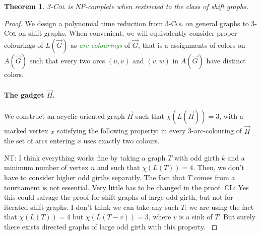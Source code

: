 \documentclass[11pt,a4aper]{article}
\newtheorem{theorem}{Theorem}
\renewcommand{\geq}{\geqslant}
\DeclareRobustCommand*{\ora}{\overrightarrow}
\newcommand*{\orG}{\ora{G}}
\newcommand*{\orH}{\ora{H}}
\newcommand*{\Col}
{\textsc{3-Col} }
\newcommand{\defin}[1]{\emph{\textcolor{ForestGreen}{#1}}}
\newcommand{\clement}[1]{{\color{orange} CL: #1}}
\newcommand{\nicolas}[1]{{\color{purple} NT: #1}}
\begin{document}
\begin{theorem}\label{thm:3col}
  \Col is NP-complete when restricted to the class of shift graphs.


\end{theorem}
\begin{proof}
  We design a polynomial time reduction from \Col on general graphs to \Col on
  shift graphs.
  When convenient, we will equivalently consider proper colourings of $L(\orG)$ as \defin{arc-colourings} of
  $\orG$, that is a assignments of colors on $A(\orG)$ such that every two arcs $(u,v)$ and
  $(v,w)$ in $A(\orG)$ have distinct colors.

  \paragraph{The gadget $\orH$.}
  We construct an acyclic oriented graph $\orH$ such that $\chi(L(\orH))=3$,
  with a marked vertex $x$ satisfying the following property: in every 3-arc-colouring of $\orH$
  the set of arcs entering $x$ uses exactly two colours. 
 

\nicolas{I think everything works fine by taking a graph $T$ with
  odd girth $k$ and a minimum number of vertex $n$ and such that
  $\chi(L(T)) = 4$. Then, we don't have to consider higher odd girths
  separatly. The fact that $T$ comes from a tournament is not
  essential. Very little has to be changed in the proof.}
\clement{Yes this could salvage the proof for shift graphs of large odd girth,
  but not for iterated shift graphs. I don't think we can take any such $T$: we
  are using the fact that $\chi(L(T)) = 4$ but $\chi(L(T-v)) = 3$, where $v$ is
  a sink of $T$. But surely there exists directed graphs of large odd girth with
  this property. }


\end{proof}
\end{document}
